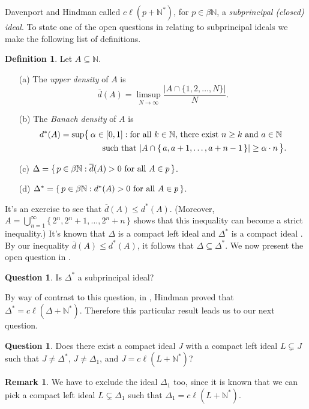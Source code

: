 \documentclass[12pt]{article}
\theoremstyle{plain}
\theoremstyle{definition}
\newtheorem{defn}[thm]{Definition}
\newtheorem{rmk}[thm]{Remark}
\newtheorem{ques}[thm]{Question}
\newcommand{\bbN}{\mathbb{N}}
\begin{document}
Davenport and Hindman called $c\ell(p+\bbN^*)$, for $p \in \beta\bbN$,
a \textsl{subprincipal (closed) ideal}.
To state one of the open questions in \cite{Davenport:1987uq} relating
to subprincipal ideals we make the following list of definitions.
\begin{defn}
  Let $A \subseteq \bbN$.
  \begin{itemize}
    \item[(a)] The \textsl{upper density} of $A$ is 
      \[
        \overline{d}(A) = \limsup_{N\to\infty} \frac{|A \cap \{1, 2,
          \ldots, N\}|}{N}.
      \]
    \item[(b)] The \textsl{Banach density} of $A$ is 
      \begin{align*}
        d^*(A) &= \sup\bigl\{\, \alpha \in [0,1] : \hbox{for all $k \in
          \bbN$, there exist $n \ge k$ and $a \in \bbN$} \\
        &\hspace{5em}\hbox{such that $|A \cap \{\,a, a+1, \ldots,
          a+n-1\,\}| \ge \alpha\cdot n$} \,\bigr\}.
      \end{align*}

    \item[(c)] $\Delta = \{\, p \in \beta\bbN : \hbox{$\overline{d}(A)
        > 0$ for all $A \in p$} \,\}$.

    \item[(d)] $\Delta^* = \{\, p \in \beta\bbN : \hbox{$d^*(A) > 0$
        for all $A \in p$} \,\}$.
  \end{itemize}
\end{defn}
It's an exercise to see that $\overline{d}(A) \le d^*(A)$.
(Moreover, $A = \bigcup_{n=1}^\infty \{\,2^n, 2^n +1, \ldots, 2^n+n
\,\}$ shows that this inequality can become a strict inequality.)
It's known that $\Delta$ is a compact left ideal \cite[Theorem
6.79]{Hindman:1998fk} and $\Delta^*$ is a compact ideal \cite[Theorem
20.5]{Hindman:1998fk}.
By our inequality $\overline{d}(A) \le d^*(A)$, it follows that
$\Delta \subseteq \Delta^*$.
We now present the open question in \cite{Davenport:1987uq}.
\begin{ques}
  Is $\Delta^*$ a subprincipal ideal?
\end{ques}

By way of contrast to this question, in \cite[Lemma
3.4]{Hindman:1988kx}, Hindman proved that $\Delta^* = c\ell(\Delta +
\bbN^*)$.  
Therefore this particular result leads us to our next question.
\begin{ques}
  Does there exist a compact ideal $J$ with a compact left ideal $L
  \subsetneq J$ such that $J \ne \Delta^*$, $J \ne \Delta_1$, and $J =
  c\ell(L + \bbN^*)$?
\end{ques}
\begin{rmk}
  We have to exclude the ideal $\Delta_1$ too, since it is known that
  we can pick a compact left ideal $L \subsetneq \Delta_1$ such that
  $\Delta_1 = c\ell(L + \bbN^*)$.
\end{rmk}
\end{document}

